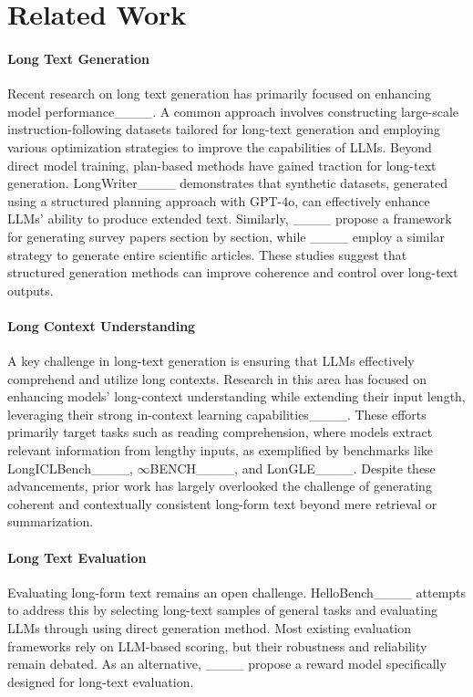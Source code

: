 \section{Related Work}
\paragraph{Long Text Generation}
Recent research on long text generation has primarily focused on enhancing model performance____. A common approach involves constructing large-scale instruction-following datasets tailored for long-text generation and employing various optimization strategies to improve the capabilities of LLMs. 
Beyond direct model training, plan-based methods have gained traction for long-text generation. LongWriter____ demonstrates that synthetic datasets, generated using a structured planning approach with GPT-4o, can effectively enhance LLMs' ability to produce extended text. Similarly, ____ propose a framework for generating survey papers section by section, while ____ employ a similar strategy to generate entire scientific articles. 
These studies suggest that structured generation methods can improve coherence and control over long-text outputs.

\paragraph{Long Context Understanding}
A key challenge in long-text generation is ensuring that LLMs effectively comprehend and utilize long contexts. Research in this area has focused on enhancing models' long-context understanding while extending their input length, leveraging their strong in-context learning capabilities____. These efforts primarily target tasks such as reading comprehension, where models extract relevant information from lengthy inputs, as exemplified by benchmarks like LongICLBench____, $\infty$BENCH____, and LonGLE____. Despite these advancements, prior work has largely overlooked the challenge of generating coherent and contextually consistent long-form text beyond mere retrieval or summarization.

\paragraph{Long Text Evaluation}
Evaluating long-form text remains an open challenge. HelloBench____ attempts to address this by selecting long-text samples of general tasks and evaluating LLMs through using direct generation method. Most existing evaluation frameworks rely on LLM-based scoring, but their robustness and reliability remain debated. As an alternative, ____ propose a reward model specifically designed for long-text evaluation. 

